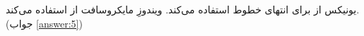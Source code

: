 \section{}
\paragraph{}\label{hint:2}
یونیکس از  برای انتهای خطوط استفاده می‌کند. ویندوزِ مایکروسافت از  استفاده می‌کند. (جواب \ref{answer:5})
